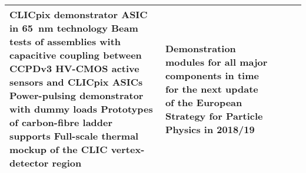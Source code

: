 \begin{landscape}
\begin{adjustbox}{max width=1.1\textwidth,totalheight=1\textheight}
\begin{tabularx}{2\textheight}{lXXXX}
        CLICpix demonstrator ASIC in \SI{65}{nm} technology\newline
        Beam tests of assemblies with capacitive coupling between CCPDv3 HV-CMOS active sensors
        and CLICpix ASICs\newline
        Power-pulsing demonstrator with dummy loads\newline
        Prototypes of carbon-fibre ladder supports\newline
        Full-scale thermal mockup of the CLIC vertex-detector region
        &
        Demonstration modules for all major components
        in time for the next update of the European Strategy
        for Particle Physics in 2018/19
        \\
    \bottomrule
\end{tabularx}
\end{adjustbox}
\end{landscape}
\restoregeometry
